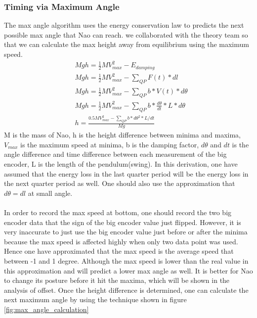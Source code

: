 \documentclass[11pt]{article}
\begin{document}
\subsubsection{Timing via Maximum Angle}
The max angle algorithm uses the energy conservation law to predicts the next possible max angle that Nao can reach. we collaborated with the theory team so that we can calculate the max height away from equilibrium using the maximum speed. 
\begin{align}
    & Mgh = \frac{1}{2}MV_{max}^2 - E_{damping}\\
    & Mgh = \frac{1}{2}MV_{max}^2 - \sum_{QP} F(t)*dl\\
    & Mgh = \frac{1}{2}MV_{max}^2 - \sum_{QP}b*V(t)*d\theta\\
    & Mgh = \frac{1}{2}MV_{max}^2 - \sum_{QP}b*\frac{d\theta}{dt}*L*d\theta\\
    & h = \frac{0.5MV_{max}^2 - \sum_{QP}b*d\theta^2*L/dt}{Mg}
\end{align}
M is the mass of Nao, h is the height difference between minima and maxima, $V_{max}$ is the maximum speed at minima, b is the damping factor, $d\theta$ and $dt$ is the angle difference and time difference between each measurement of the big encoder, L is the length of the pendulum(swing). In this derivation, one have assumed that the energy loss in the last quarter period will be the energy loss in the next quarter period as well. One should also use the approximation that $d\theta = dl$ at small angle. 
\\
\\
In order to record the max speed at bottom, one should record the two big encoder data that the sign of the big encoder value just flipped. However, it is very inaccurate to just use the big encoder value just before or after the minima because the max speed is affected highly when only two data point was used. Hence one have approximated that the max speed is the average speed that between -1 and 1 degree. Although the max speed is lower than the real value in this approximation and will predict a lower max angle as well. It is better for Nao to change its posture before it hit the maxima, which will be shown in the analysis of offset.  Once the height difference is determined, one can calculate the next maximum angle by using the technique shown in figure \ref{fig:max_angle_calculation}
\end{document}
